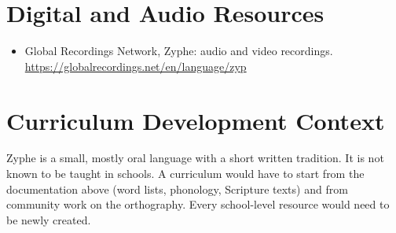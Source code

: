 \documentclass[12pt]{article}
\begin{document}
\section{Digital and Audio Resources}
\begin{itemize}
\item Global Recordings Network, Zyphe: audio and video recordings. \url{https://globalrecordings.net/en/language/zyp}
\end{itemize}

\section{Curriculum Development Context}
Zyphe is a small, mostly oral language with a short written tradition. It is not known to be taught in schools. A curriculum would have to start from the documentation above (word lists, phonology, Scripture texts) and from community work on the orthography. Every school-level resource would need to be newly created.
\end{document}
